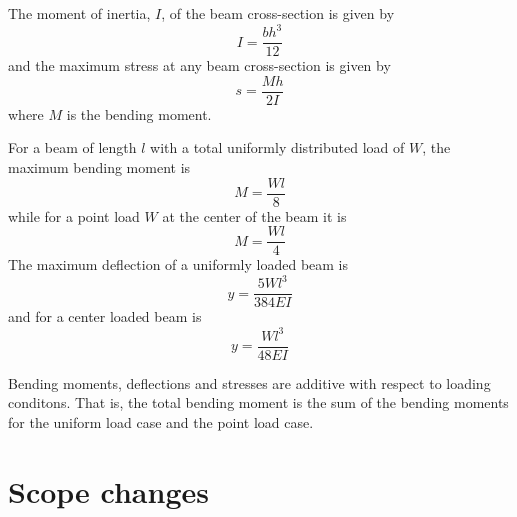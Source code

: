 \documentclass{article}
\newenvironment{exercises}{\begin{enumerate}}{\end{enumerate}}
\begin{document}
\begin{exercises}
    The moment of inertia, $I$, of the beam cross-section is given by
    \begin{displaymath} I = \frac{bh^{3}}{12}  \end{displaymath}
    and the maximum stress at any beam cross-section is given by
    \begin{displaymath} s = \frac{Mh}{2I}  \end{displaymath}
    where $M$ is the bending moment.

    For a beam of length $l$ with a total uniformly distributed load of $W$,
    the maximum  bending moment is
    \begin{displaymath} M = \frac{Wl}{8}    \end{displaymath}
    while for a point load $W$ at the center of the beam it is
    \begin{displaymath} M = \frac{Wl}{4}    \end{displaymath}
    The maximum deflection of a uniformly loaded beam is
    \begin{displaymath} y = \frac{5Wl^{3}}{384EI}  \end{displaymath}
    and for a center loaded beam is
    \begin{displaymath} y = \frac{Wl^{3}}{48EI}    \end{displaymath}

    Bending moments, deflections and stresses are additive with respect to 
    loading conditons. That is, the total bending moment is the sum of the
    bending moments for the uniform load case and the point load case.

\end{exercises}

\clearpage
\section{Scope changes}
\end{document}
